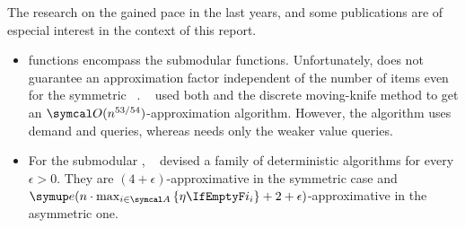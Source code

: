 The research on the \NSW{} gained pace in the last years, and some publications are of especial interest in the context of this report.
\begin{itemize}
	\item
	\XOS{} functions encompass the submodular functions.
	Unfortunately, \RepReMatch{} does not guarantee an approximation factor independent of the number of items even for the symmetric \XOS{} \NSW~\cite[Section 6.2]{APNSWuSVþUM}.
	~\cite{sublin_approx_algo_for_nsw_with_xos_valuations} used both \RepReMatch{} and the discrete moving-knife method to get an \(\bigo(n^{53/54})\)-approximation algorithm.
	However, the algorithm uses demand and \XOS{} queries, whereas \RepReMatch{} needs only the weaker value queries.


	\item
	For the submodular \NSW, \citeauthor{approx_nsw_by_matching_and_local_search}~\cite{approx_nsw_by_matching_and_local_search} devised a family of deterministic algorithms for every \(\epsilon > 0\).
	They are \((4+\epsilon)\)-approximative in the symmetric case and \(\euler(n \cdot \max_{i \in \agents} \,\braces{\weight} + 2 + \epsilon)\)-approximative in the asymmetric one.



\end{itemize}
